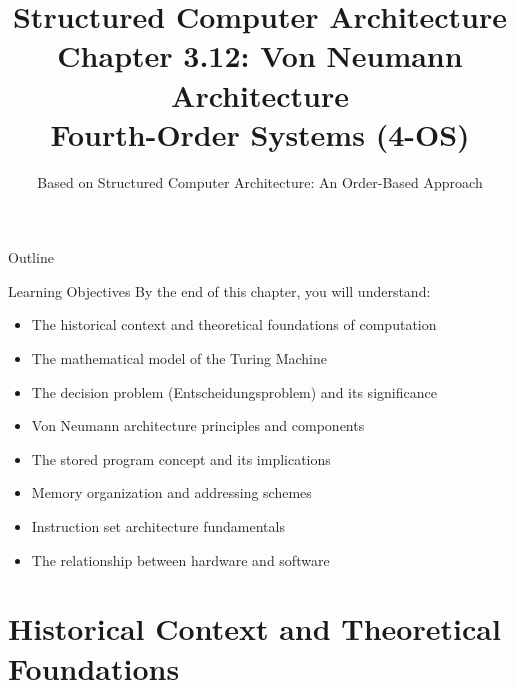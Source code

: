 \documentclass[aspectratio=169]{beamer}
\title[Chapter 3.12: Von Neumann Architecture]{Structured Computer Architecture\\Chapter 3.12: Von Neumann Architecture\\Fourth-Order Systems (4-OS)}
\author{Based on Structured Computer Architecture: An Order-Based Approach}
\date{}
\begin{document}
\begin{frame}
\titlepage
\end{frame}

\begin{frame}{Outline}
\tableofcontents
\end{frame}

\begin{frame}{Learning Objectives}
By the end of this chapter, you will understand:
\begin{itemize}
\item The historical context and theoretical foundations of computation
\item The mathematical model of the Turing Machine
\item The decision problem (Entscheidungsproblem) and its significance
\item Von Neumann architecture principles and components
\item The stored program concept and its implications
\item Memory organization and addressing schemes
\item Instruction set architecture fundamentals
\item The relationship between hardware and software
\end{itemize}
\end{frame}

\section{Historical Context and Theoretical Foundations}
\end{document}
